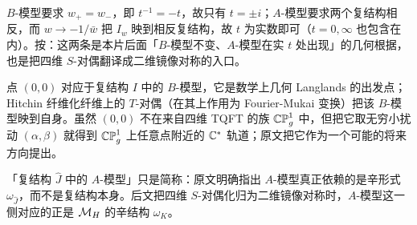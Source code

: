 \begin{yizhu}[含糊点拨]
$B$-模型要求 $w_+=w_-$，即 $t^{-1}=-t$，故只有 $t=\pm i$；$A$-模型要求两个复结构相反，而 $w\to-1/\bar w$ 把 $I_w$ 映到相反复结构，故 $t$ 为实数即可（$t=0,\infty$ 也包含在内）。按：这两条是本片后面「$B$-模型不变、$A$-模型在实 $t$ 处出现」的几何根据，也是把四维 $S$-对偶翻译成二维镜像对称的入口。
\end{yizhu}

\begin{yizhu}[物理图像]
点 $(0,0)$ 对应于复结构 $I$ 中的 $B$-模型，它是数学上几何 Langlands 的出发点；Hitchin 纤维化纤维上的 $T$-对偶（在其上作用为 Fourier-Mukai 变换）把该 $B$-模型映到自身。虽然 $(0,0)$ 不在来自四维 TQFT 的族 $\Bbb{CP}^1_g$ 中，但把它取无穷小扰动 $(\alpha,\beta)$ 就得到 $\Bbb{CP}^1_g$ 上任意点附近的 $\Bbb{C}^*$ 轨道；原文把它作为一个可能的将来方向提出。
\end{yizhu}

\begin{yizhu}[易错点]
「复结构 $\hat J$ 中的 $A$-模型」只是简称：原文明确指出 $A$-模型真正依赖的是辛形式 $\omega_{\hat J}$，而不是复结构本身。后文把四维 $S$-对偶化归为二维镜像对称时，$A$-模型这一侧对应的正是 $\MH$ 的辛结构 $\omega_K$。
\end{yizhu}
